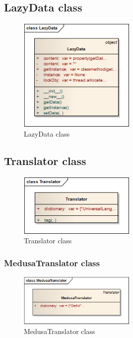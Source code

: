 \subsection{LazyData class}
\begin{figure}[H]
   \centering
   \includegraphics[width=0.5\textwidth]{pic/LazyData.png}%
   \caption{LazyData class}
   \label{LazyDatapic}%
\end{figure}

\newpage
\subsection{Translator class}
\begin{figure}[H]
   \centering
   \includegraphics[width=0.5\textwidth]{pic/Translator.png}%
   \caption{Translator class}
   \label{Translatorpic}%
\end{figure}

\subsubsection{MedusaTranslator class}
\begin{figure}[H]
   \centering
   \includegraphics[width=0.5\textwidth]{pic/MedusaTranslator.png}%
   \caption{MedusaTranslator class}
   \label{MedusaTranslatorpic}%
\end{figure}

